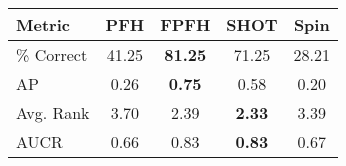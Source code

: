 \begin{tabular}{ | l || c | c | c | c | }
\hline
Metric & PFH & FPFH & SHOT & Spin \\
\hline
 \% Correct & 41.25 & \bf 81.25 & 71.25 & 28.21 \\
AP & 0.26 & \bf 0.75 & 0.58 & 0.20 \\
Avg. Rank & 3.70 & 2.39 & \bf 2.33 & 3.39 \\
AUCR & 0.66 & 0.83 & \bf 0.83 & 0.67 \\
\hline
\end{tabular}